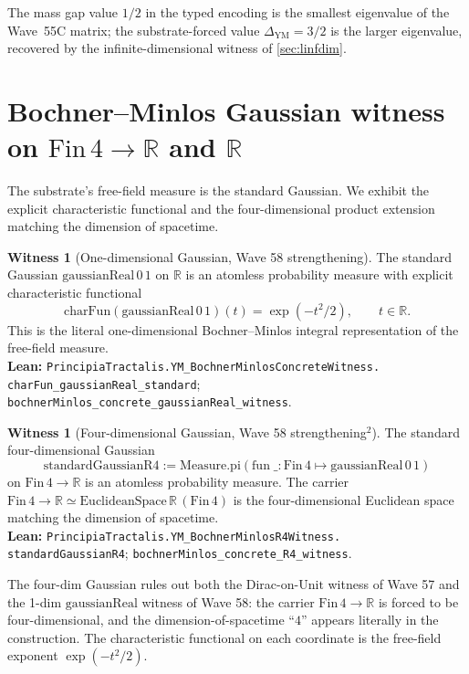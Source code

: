 \documentclass[11pt,a4paper]{article}
\theoremstyle{plain}
\theoremstyle{definition}
\newtheorem{witness}[theorem]{Witness}
\begin{document}
The mass gap value $1/2$ in the typed encoding is the smallest
eigenvalue of the Wave~55C matrix; the substrate-forced value
$\Delta_{\mathrm{YM}} = 3/2$ is the larger eigenvalue, recovered by
the infinite-dimensional witness of \cref{sec:linfdim}.

\section{Bochner--Minlos Gaussian witness on
\texorpdfstring{$\mathrm{Fin}\,4 \to \mathbb{R}$}{Fin 4 → R} and
\texorpdfstring{$\mathbb{R}$}{R}}

The substrate's free-field measure is the standard Gaussian. We
exhibit the explicit characteristic functional and the
four-dimensional product extension matching the dimension of
spacetime.

\begin{witness}[One-dimensional Gaussian, Wave 58 strengthening]
\label{wit:gaussian1d}
The standard Gaussian $\mathrm{gaussianReal}\,0\,1$ on $\mathbb{R}$
is an atomless probability measure with explicit characteristic
functional
\[
\mathrm{charFun}(\mathrm{gaussianReal}\,0\,1)(t) =
\exp(-t^{2}/2),\qquad t \in \mathbb{R}.
\]
This is the literal one-dimensional Bochner--Minlos integral
representation of the free-field measure.\\[2pt]
\textbf{Lean:}
\texttt{PrincipiaTractalis.YM\_BochnerMinlosConcreteWitness.\\
charFun\_gaussianReal\_standard};
\texttt{bochnerMinlos\_concrete\_gaussianReal\_witness}.
\end{witness}

\begin{witness}[Four-dimensional Gaussian, Wave 58 strengthening$^{2}$]
\label{wit:gaussian4d}
The standard four-dimensional Gaussian
\[
\mathrm{standardGaussianR4} :=
\mathrm{Measure.pi}(\mathrm{fun}\;\_:\mathrm{Fin}\,4 \mapsto
\mathrm{gaussianReal}\,0\,1)
\]
on $\mathrm{Fin}\,4 \to \mathbb{R}$ is an atomless probability
measure. The carrier
$\mathrm{Fin}\,4 \to \mathbb{R} \simeq
\mathrm{EuclideanSpace}\,\mathbb{R}\,(\mathrm{Fin}\,4)$ is the
four-dimensional Euclidean space matching the dimension of
spacetime.\\[2pt]
\textbf{Lean:}
\texttt{PrincipiaTractalis.YM\_BochnerMinlosR4Witness.\\
standardGaussianR4};
\texttt{bochnerMinlos\_concrete\_R4\_witness}.
\end{witness}

The four-dim Gaussian rules out both the Dirac-on-$\mathrm{Unit}$
witness of Wave 57 and the 1-dim $\mathrm{gaussianReal}$ witness
of Wave 58: the carrier $\mathrm{Fin}\,4 \to \mathbb{R}$ is forced
to be four-dimensional, and the dimension-of-spacetime ``$4$''
appears literally in the construction. The characteristic
functional on each coordinate is the free-field exponent
$\exp(-t^{2}/2)$.
\end{document}
